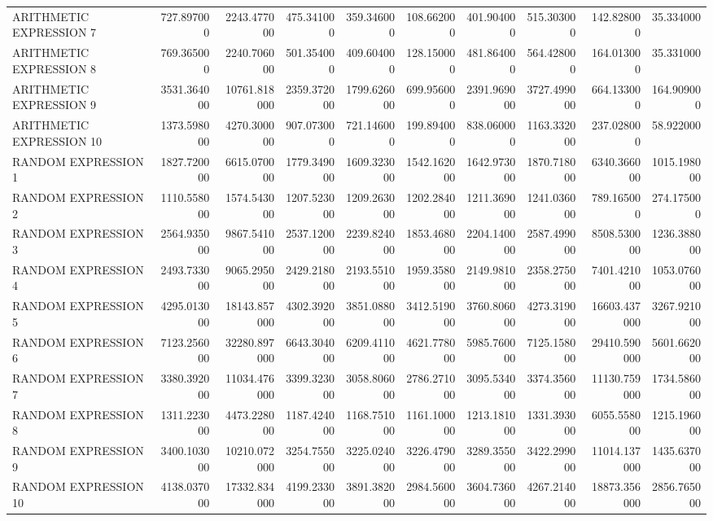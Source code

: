 \begin{longtable}{lrrrrrrrrr}
ARITHMETIC EXPRESSION 7 & 727.897000 & 2243.477000 & 475.341000 & 359.346000 & 108.662000 & 401.904000 & 515.303000 & 142.828000 & 35.334000 \\
ARITHMETIC EXPRESSION 8 & 769.365000 & 2240.706000 & 501.354000 & 409.604000 & 128.150000 & 481.864000 & 564.428000 & 164.013000 & 35.331000 \\
ARITHMETIC EXPRESSION 9 & 3531.364000 & 10761.818000 & 2359.372000 & 1799.626000 & 699.956000 & 2391.969000 & 3727.499000 & 664.133000 & 164.909000 \\
ARITHMETIC EXPRESSION 10 & 1373.598000 & 4270.300000 & 907.073000 & 721.146000 & 199.894000 & 838.060000 & 1163.332000 & 237.028000 & 58.922000 \\
RANDOM EXPRESSION 1 & 1827.720000 & 6615.070000 & 1779.349000 & 1609.323000 & 1542.162000 & 1642.973000 & 1870.718000 & 6340.366000 & 1015.198000 \\
RANDOM EXPRESSION 2 & 1110.558000 & 1574.543000 & 1207.523000 & 1209.263000 & 1202.284000 & 1211.369000 & 1241.036000 & 789.165000 & 274.175000 \\
RANDOM EXPRESSION 3 & 2564.935000 & 9867.541000 & 2537.120000 & 2239.824000 & 1853.468000 & 2204.140000 & 2587.499000 & 8508.530000 & 1236.388000 \\
RANDOM EXPRESSION 4 & 2493.733000 & 9065.295000 & 2429.218000 & 2193.551000 & 1959.358000 & 2149.981000 & 2358.275000 & 7401.421000 & 1053.076000 \\
RANDOM EXPRESSION 5 & 4295.013000 & 18143.857000 & 4302.392000 & 3851.088000 & 3412.519000 & 3760.806000 & 4273.319000 & 16603.437000 & 3267.921000 \\
RANDOM EXPRESSION 6 & 7123.256000 & 32280.897000 & 6643.304000 & 6209.411000 & 4621.778000 & 5985.760000 & 7125.158000 & 29410.590000 & 5601.662000 \\
RANDOM EXPRESSION 7 & 3380.392000 & 11034.476000 & 3399.323000 & 3058.806000 & 2786.271000 & 3095.534000 & 3374.356000 & 11130.759000 & 1734.586000 \\
RANDOM EXPRESSION 8 & 1311.223000 & 4473.228000 & 1187.424000 & 1168.751000 & 1161.100000 & 1213.181000 & 1331.393000 & 6055.558000 & 1215.196000 \\
RANDOM EXPRESSION 9 & 3400.103000 & 10210.072000 & 3254.755000 & 3225.024000 & 3226.479000 & 3289.355000 & 3422.299000 & 11014.137000 & 1435.637000 \\
RANDOM EXPRESSION 10 & 4138.037000 & 17332.834000 & 4199.233000 & 3891.382000 & 2984.560000 & 3604.736000 & 4267.214000 & 18873.356000 & 2856.765000 \\

\end{longtable}
